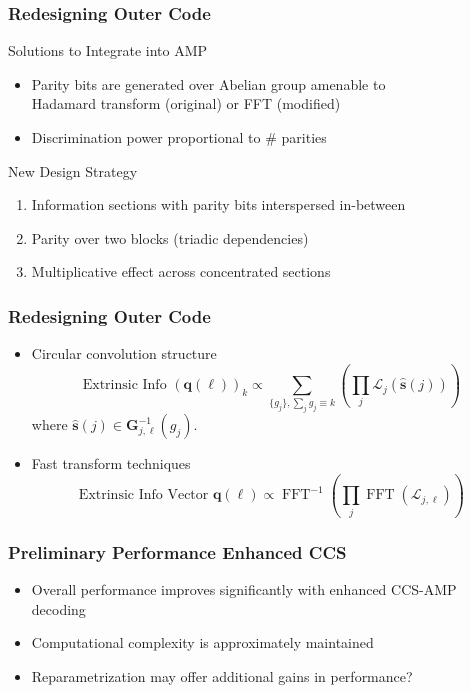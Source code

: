\documentclass[10pt]{beamer}
\begin{document}
\begin{frame}
\frametitle{Redesigning Outer Code}
\begin{block}{Solutions to Integrate into AMP}
\begin{itemize}
\item Parity bits are generated over Abelian group amenable to\\
Hadamard transform (original) or FFT (modified)
\item Discrimination power proportional to \# parities
\end{itemize}
\end{block}
\centerline{}
\begin{block}{New Design Strategy}
\begin{enumerate}
\item Information sections with parity bits interspersed in-between
\item Parity over two blocks (triadic dependencies)
\item Multiplicative effect across concentrated sections
\end{enumerate}
\end{block}
\end{frame}


\begin{frame}
\frametitle{Redesigning Outer Code}
\begin{itemize}
\item Circular convolution structure
\begin{equation*}
\text{Extrinsic Info }
\left( \mathbf{q}(\ell) \right)_k
\textstyle \propto \sum_{\{ g_j \}, \sum_{j} g_j \equiv k} \left( \prod_{j}
\mathcal{L}_{j} \left( \hat{\mathbf{s}}(j) \right) \right)
\end{equation*}
where $\hat{\mathbf{s}}(j) \in \mathbf{G}_{j,\ell}^{-1}(g_j)$.
\item Fast transform techniques
\begin{equation*}
\text{Extrinsic Info Vector }
\mathbf{q}(\ell)
\textstyle \propto \operatorname{FFT}^{-1} \left( \prod_{j} \operatorname{FFT} \left( \boldsymbol{\mathcal{L}}_{j,\ell} \right) \right)
\end{equation*}
\end{itemize}
\centerline{}
\end{frame}


\begin{frame}
\frametitle{Preliminary Performance Enhanced CCS}
\centerline{
  \scalebox{0.65}{}
  \scalebox{0.65}{}}
\vspace{5mm}
\begin{itemize}
\item Overall performance improves significantly with enhanced CCS-AMP decoding
\item Computational complexity is approximately maintained
\item Reparametrization may offer additional gains in performance?
\end{itemize}
\end{frame}
\end{document}
